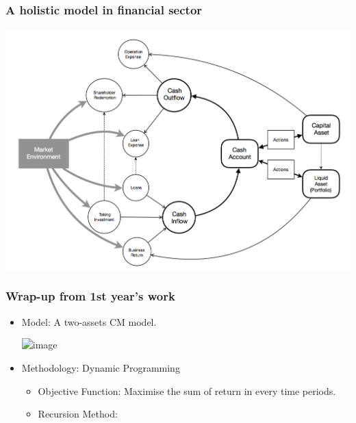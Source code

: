 \documentclass{beamer}
\begin{document}
\begin{frame}
\frametitle{A holistic model in financial sector}
\includegraphics[scale = 0.25]{Holistic.png}

\end{frame}
\begin{frame}
\frametitle{Wrap-up from 1st year's work}


\begin{itemize}
\item<2->Model: A two-assets CM model.


\includegraphics<3>[scale = 0.25]{twoAcMod.png}

\item<4->Methodology: Dynamic Programming

\begin{itemize}
\item<5-7> Objective Function: Maximise the sum of return in every time periods.

\item <6-7>Recursion Method:

\end{itemize}
\end{itemize}
\end{frame}
\end{document}
